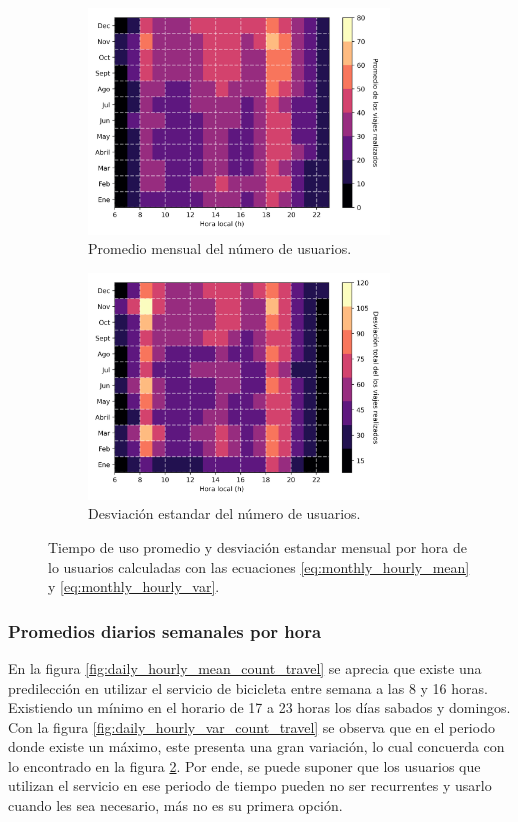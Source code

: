 \begin{figure}[H]
    \centering
    \begin{subfigure}[b]{8cm}
        \includegraphics[width=8cm]{Graphics/monthly_hourly_mean_count_travel.png}
        \caption{Promedio mensual del número de usuarios.}
        \label{fig:monthly_hourly_mean_count_travel}
    \end{subfigure}
    \begin{subfigure}[b]{8cm}
        \includegraphics[width=8cm]{Graphics/monthly_hourly_var_count_travel.png}
        \caption{Desviación estandar del número de usuarios.}
        \label{fig:monthly_hourly_var_count_travel}
    \end{subfigure}
    \caption{Tiempo de uso promedio y desviación estandar mensual por hora de lo usuarios calculadas con las ecuaciones \ref{eq:monthly_hourly_mean} y \ref{eq:monthly_hourly_var}.}
    \label{fig:monthly_hourly_count_travel}
\end{figure}

\subsubsection{Promedios diarios semanales por hora}

En la figura \ref{fig:daily_hourly_mean_count_travel} se aprecia que existe una predilección en utilizar el servicio de bicicleta entre semana a las 8 y 16 horas. Existiendo un mínimo en el horario de 17 a 23 horas los días sabados y domingos. Con la figura \ref{fig:daily_hourly_var_count_travel} se observa que en el periodo donde existe un máximo, este presenta una gran variación, lo cual concuerda con lo encontrado en la figura \ref{fig:monthly_hourly_var_count_travel}. Por ende, se puede suponer que los usuarios que utilizan el servicio en ese periodo de tiempo pueden no ser recurrentes y usarlo cuando les sea necesario, más no es su primera opción.

